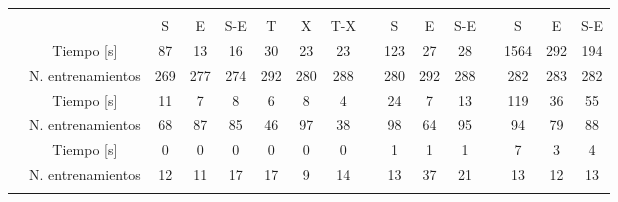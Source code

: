 \begin{table}
  \tableStyle
  \smaller
  \begin{tabular}{ccSSSSSScSSScSSS}
    \toprule
    && 
    && 
    && \\
    \cmidrule(lr){3-8}\cmidrule(lr){10-12}\cmidrule(lr){14-16} &&
    {S} & {E} &{S-E}& {T} & {X} &{T-X}&& {S} & {E} &{S-E}&& {S} & {E} &{S-E}\\
    \midrule
     & Tiempo [s] &
    87  & 13  & 16  & 30  & 23  & 23  && 123 & 27  & 28  &&1564 & 292 & 194 \\
    \cmidrule(lr){2-16} & N. entrenamientos &
    269 & 277 & 274 & 292 & 280 & 288 && 280 & 292 & 288 && 282 & 283 & 282 \\
    \midrule
     & Tiempo [s] &
    11  & 7   & 8   & 6   & 8   & 4   && 24  & 7   & 13  && 119 & 36  & 55  \\
    \cmidrule(lr){2-16} & N. entrenamientos &
    68  & 87  & 85  & 46  & 97  & 38  && 98  & 64  & 95  && 94  & 79  & 88  \\
    \midrule
     & Tiempo [s] &
    0   &   0 & 0   & 0   & 0   & 0   && 1   & 1   & 1   && 7   & 3   & 4   \\
    \cmidrule(lr){2-16} & N. entrenamientos &
    12  & 11  & 17  & 17  & 9   & 14  && 13  & 37  & 21  && 13  & 12  & 13  \\
    \bottomrule
    \\
    \end{tabular}

\end{table}
